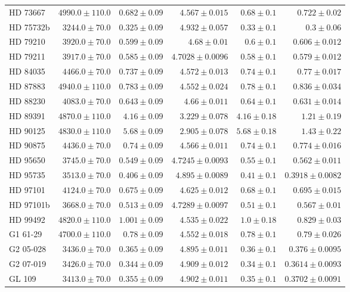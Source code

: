 \begin{longtable*}{lrrrrr}
HD 73667 & $4990.0\pm 110.0$ & $0.682\pm 0.09$ & $4.567\pm 0.015$ & $0.68\pm 0.1$ & $0.722\pm 0.02$ \\ 
HD 75732b & $3244.0\pm 70.0$ & $0.325\pm 0.09$ & $4.932\pm 0.057$ & $0.33\pm 0.1$ & $0.3\pm 0.06$ \\ 
HD 79210 & $3920.0\pm 70.0$ & $0.599\pm 0.09$ & $4.68\pm 0.01$ & $0.6\pm 0.1$ & $0.606\pm 0.012$ \\ 
HD 79211 & $3917.0\pm 70.0$ & $0.585\pm 0.09$ & $4.7028\pm 0.0096$ & $0.58\pm 0.1$ & $0.579\pm 0.012$ \\ 
HD 84035 & $4466.0\pm 70.0$ & $0.737\pm 0.09$ & $4.572\pm 0.013$ & $0.74\pm 0.1$ & $0.77\pm 0.017$ \\ 
HD 87883 & $4940.0\pm 110.0$ & $0.783\pm 0.09$ & $4.552\pm 0.024$ & $0.78\pm 0.1$ & $0.836\pm 0.034$ \\ 
HD 88230 & $4083.0\pm 70.0$ & $0.643\pm 0.09$ & $4.66\pm 0.011$ & $0.64\pm 0.1$ & $0.631\pm 0.014$ \\ 
HD 89391 & $4870.0\pm 110.0$ & $4.16\pm 0.09$ & $3.229\pm 0.078$ & $4.16\pm 0.18$ & $1.21\pm 0.19$ \\ 
HD 90125 & $4830.0\pm 110.0$ & $5.68\pm 0.09$ & $2.905\pm 0.078$ & $5.68\pm 0.18$ & $1.43\pm 0.22$ \\ 
HD 90875 & $4436.0\pm 70.0$ & $0.74\pm 0.09$ & $4.566\pm 0.011$ & $0.74\pm 0.1$ & $0.774\pm 0.016$ \\ 
HD 95650 & $3745.0\pm 70.0$ & $0.549\pm 0.09$ & $4.7245\pm 0.0093$ & $0.55\pm 0.1$ & $0.562\pm 0.011$ \\ 
HD 95735 & $3513.0\pm 70.0$ & $0.406\pm 0.09$ & $4.895\pm 0.0089$ & $0.41\pm 0.1$ & $0.3918\pm 0.0082$ \\ 
HD 97101 & $4124.0\pm 70.0$ & $0.675\pm 0.09$ & $4.625\pm 0.012$ & $0.68\pm 0.1$ & $0.695\pm 0.015$ \\ 
HD 97101b & $3668.0\pm 70.0$ & $0.513\pm 0.09$ & $4.7289\pm 0.0097$ & $0.51\pm 0.1$ & $0.567\pm 0.01$ \\ 
HD 99492 & $4820.0\pm 110.0$ & $1.001\pm 0.09$ & $4.535\pm 0.022$ & $1.0\pm 0.18$ & $0.829\pm 0.03$ \\ 
G1 61-29 & $4700.0\pm 110.0$ & $0.78\pm 0.09$ & $4.552\pm 0.018$ & $0.78\pm 0.1$ & $0.79\pm 0.026$ \\ 
G2 05-028 & $3436.0\pm 70.0$ & $0.365\pm 0.09$ & $4.895\pm 0.011$ & $0.36\pm 0.1$ & $0.376\pm 0.0095$ \\ 
G2 07-019 & $3426.0\pm 70.0$ & $0.344\pm 0.09$ & $4.909\pm 0.012$ & $0.34\pm 0.1$ & $0.3614\pm 0.0093$ \\ 
GL 109 & $3413.0\pm 70.0$ & $0.355\pm 0.09$ & $4.902\pm 0.011$ & $0.35\pm 0.1$ & $0.3702\pm 0.0091$ \\ 

\end{longtable*}
